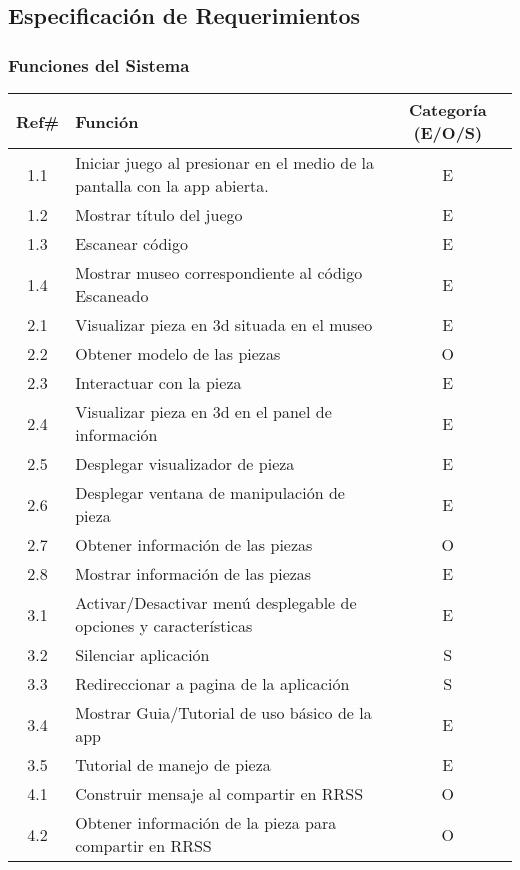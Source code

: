 \subsection{Especificación de Requerimientos}




\subsubsection{Funciones del Sistema}

\begin{longtable}{|c|p{10cm}|c|}
\hline 
Ref\# & Función & Categoría (E/O/S) \\ 
\hline 
1.1 & Iniciar juego al presionar en el medio de la pantalla con la app abierta. & E \\ 
\hline 
1.2 & Mostrar título del juego & E \\ 
\hline 
1.3 & Escanear código & E \\ 
\hline 
1.4 & Mostrar museo correspondiente al código Escaneado & E \\ 
\hline 
2.1 & Visualizar pieza en 3d situada en el museo & E \\ 
\hline 
2.2 & Obtener modelo de las piezas & O \\ 
\hline 
2.3 & Interactuar con la pieza & E \\ 
\hline 
2.4 & Visualizar pieza en 3d en el panel de información & E \\ 
\hline 
2.5 & Desplegar visualizador de pieza & E \\ 
\hline 
2.6 & Desplegar ventana de manipulación de pieza & E \\ 
\hline 
2.7 & Obtener información de las piezas & O \\ 
\hline 
2.8 & Mostrar información de las piezas & E \\ 
\hline 
3.1 & Activar/Desactivar menú desplegable de opciones y características & E \\ 
\hline 
3.2 & Silenciar aplicación & S \\ 
\hline 
3.3 & Redireccionar a pagina de la aplicación & S \\ 
\hline 
3.4 & Mostrar Guia/Tutorial de uso básico de la app & E \\ 
\hline 
3.5 & Tutorial de manejo de pieza & E \\ 
\hline 
4.1 & Construir mensaje al compartir en RRSS & O \\ 
\hline 
4.2 & Obtener información de la pieza para compartir en RRSS & O \\ 

\end{longtable}
